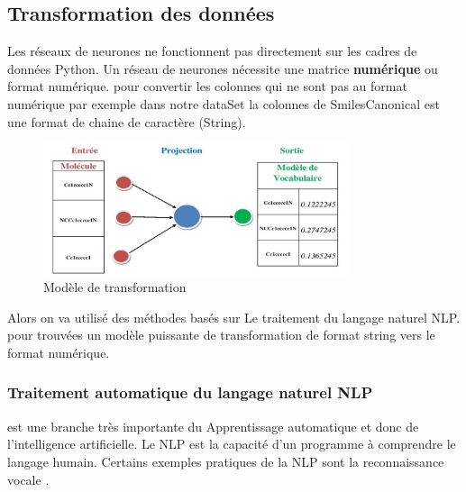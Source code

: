 \documentclass[12pt]{report}
\begin{document}
\subsection{Transformation des données}
Les réseaux de neurones ne fonctionnent pas directement sur les cadres de données Python. Un réseau de neurones nécessite une matrice \textbf{numérique} ou format numérique. pour convertir les colonnes qui ne sont pas au format numérique par exemple dans notre dataSet la colonnes de  SmilesCanonical est une format de chaine de caractère (String). \\
\begin{figure}[h]
\begin{center}
\includegraphics[width=340]{nlp.jpg}
\caption{Modèle de transformation}
\end{center}

\end{figure}



Alors on va utilisé des méthodes basés sur Le traitement du langage naturel NLP. pour trouvées un modèle puissante de transformation de format string vers le format numérique.

\subsubsection{Traitement automatique du langage naturel NLP}
est une branche très importante du Apprentissage automatique et donc de l'intelligence artificielle. Le NLP est la capacité d'un programme à comprendre le langage humain. Certains exemples pratiques de la NLP sont la reconnaissance vocale \cite{ref26}.
\end{document}
